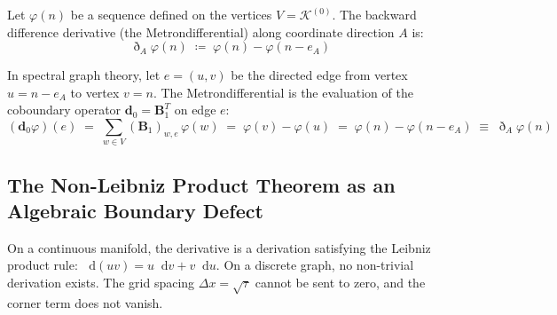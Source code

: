\documentclass[
    12pt,
    a4paper,
    headings=normal,
    twoside=false,
    open=any,
    parskip=half
]{scrbook}
\newcommand{\ethop}{\eth}
\newcommand{\diff}{\mathop{}\!\mathrm{d}}
\begin{document}
Let $\varphi(n)$ be a sequence defined on the vertices $V = \mathcal{K}^{(0)}$. The backward difference derivative (the Metrondifferential) along coordinate direction $A$ is:
\begin{equation}
\ethop_A \varphi(n) \;\coloneqq\; \varphi(n) - \varphi(n - e_A)
\label{eq:ch1_ethop_definition_recap}
\end{equation}

In spectral graph theory, let $e = (u, v)$ be the directed edge from vertex $u = n - e_A$ to vertex $v = n$. The Metrondifferential is the evaluation of the coboundary operator $\mathbf{d}_0 = \mathbf{B}_1^T$ on edge $e$:
\begin{equation}
\left( \mathbf{d}_0 \varphi \right)(e) \;=\; \sum_{w \in V} (\mathbf{B}_1)_{w, e} \, \varphi(w) \;=\; \varphi(v) - \varphi(u) \;=\; \varphi(n) - \varphi(n - e_A) \;\equiv\; \ethop_A \varphi(n)
\label{eq:ch1_ethop_graph_incidence}
\end{equation}

\subsection{The Non-Leibniz Product Theorem as an Algebraic Boundary Defect}

On a continuous manifold, the derivative is a derivation satisfying the Leibniz product rule: $\diff(uv) = u\diff v + v\diff u$. On a discrete graph, no non-trivial derivation exists. The grid spacing $\Delta x = \sqrt{\tau}$ cannot be sent to zero, and the corner term does not vanish.
\end{document}
